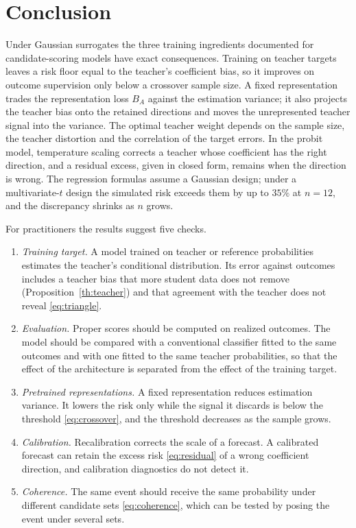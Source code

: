 \documentclass[11pt]{article}
\theoremstyle{remark}
\newcommand{\1}{\mathbf 1}
\begin{document}
\section{Conclusion}\label{sec:conclusion}
Under Gaussian surrogates the three training ingredients documented for candidate-scoring models have exact consequences. Training on teacher targets leaves a risk floor equal to the teacher's coefficient bias, so it improves on outcome supervision only below a crossover sample size. A fixed representation trades the representation loss $B_A$ against the estimation variance; it also projects the teacher bias onto the retained directions and moves the unrepresented teacher signal into the variance. The optimal teacher weight depends on the sample size, the teacher distortion and the correlation of the target errors. In the probit model, temperature scaling corrects a teacher whose coefficient has the right direction, and a residual excess, given in closed form, remains when the direction is wrong. The regression formulas assume a Gaussian design; under a multivariate-$t$ design the simulated risk exceeds them by up to $35\%$ at $n=12$, and the discrepancy shrinks as $n$ grows.

For practitioners the results suggest five checks.
\begin{enumerate}
\item \emph{Training target.} A model trained on teacher or reference probabilities estimates the teacher's conditional distribution. Its error against outcomes includes a teacher bias that more student data does not remove (Proposition~\ref{th:teacher}) and that agreement with the teacher does not reveal \eqref{eq:triangle}.
\item \emph{Evaluation.} Proper scores should be computed on realized outcomes. The model should be compared with a conventional classifier fitted to the same outcomes and with one fitted to the same teacher probabilities, so that the effect of the architecture is separated from the effect of the training target.
\item \emph{Pretrained representations.} A fixed representation reduces estimation variance. It lowers the risk only while the signal it discards is below the threshold \eqref{eq:crossover}, and the threshold decreases as the sample grows.
\item \emph{Calibration.} Recalibration corrects the scale of a forecast. A calibrated forecast can retain the excess risk \eqref{eq:residual} of a wrong coefficient direction, and calibration diagnostics do not detect it.
\item \emph{Coherence.} The same event should receive the same probability under different candidate sets \eqref{eq:coherence}, which can be tested by posing the event under several sets.
\end{enumerate}
\end{document}
